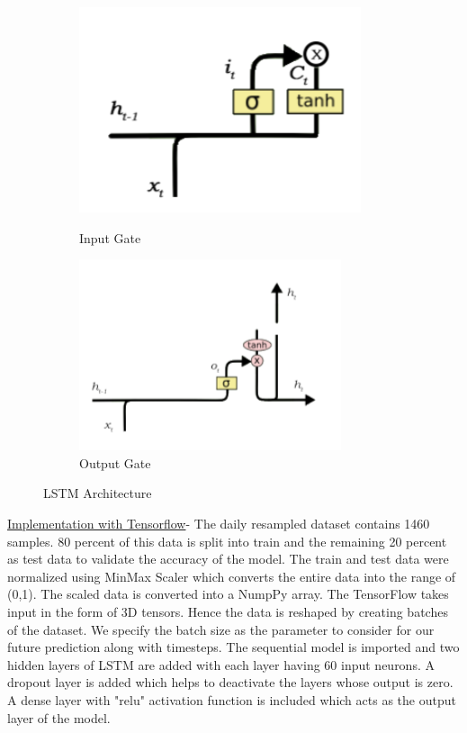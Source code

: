 \documentclass[12 pt]{report}
\begin{document}
\begin{figure}[ht]
\begin{subfigure}{.5\textwidth}
\end{subfigure}
\begin{subfigure}{.5\textwidth}
  \centering
      \includegraphics[width=.8\linewidth,frame]{images/ingate.png}  
  \caption{Input Gate}
  \label{fig:Input Gate}
  \includegraphics[width=.8\linewidth,frame]{images/outgate.png}  
  \caption{Output Gate}
  \label{fig:Output Gate}
\end{subfigure}
\caption{LSTM Architecture}
\label{fig:fig}
\end{figure}

 \newpage
\underline{Implementation with Tensorflow}-
\newline
\newline
  The daily resampled dataset contains 1460 samples. 80 percent of this data is split into train and the remaining 20 percent as test data to validate the accuracy of the model. The train and test data were normalized using MinMax Scaler which converts the entire data into the range of (0,1). The scaled data is converted into a NumpPy array. 
  The TensorFlow takes input in the form of 3D tensors. Hence the data is reshaped by creating batches of the dataset. We specify the batch size as the parameter to consider for our future prediction along with timesteps. 
  \newline
  The sequential model is imported and two hidden layers of LSTM are added with each layer having 60 input neurons. A dropout layer is added which helps to deactivate the layers whose output is zero. A dense layer with "relu" activation function is included which acts as the output layer of the model.
  
\end{document}
